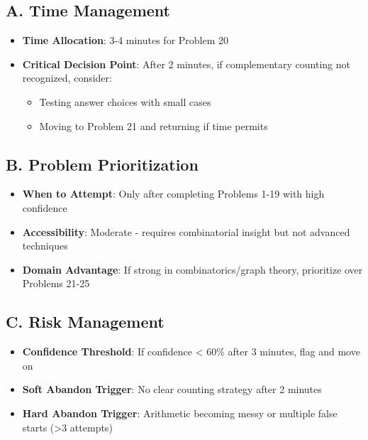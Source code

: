\documentclass[]{article}
\begin{document}
\begin{competitionbox}
\subsection*{A. Time Management}
\begin{itemize}[leftmargin=*]
    \item \textbf{Time Allocation}: 3-4 minutes for Problem 20
    \item \textbf{Critical Decision Point}: After 2 minutes, if complementary counting not recognized, consider:
    \begin{itemize}
        \item Testing answer choices with small cases
        \item Moving to Problem 21 and returning if time permits
    \end{itemize}
\end{itemize}

\subsection*{B. Problem Prioritization}
\begin{itemize}[leftmargin=*]
    \item \textbf{When to Attempt}: Only after completing Problems 1-19 with high confidence
    \item \textbf{Accessibility}: Moderate - requires combinatorial insight but not advanced techniques
    \item \textbf{Domain Advantage}: If strong in combinatorics/graph theory, prioritize over Problems 21-25
\end{itemize}

\subsection*{C. Risk Management}
\begin{itemize}[leftmargin=*]
    \item \textbf{Confidence Threshold}: If confidence < 60\% after 3 minutes, flag and move on
    \item \textbf{Soft Abandon Trigger}: No clear counting strategy after 2 minutes
    \item \textbf{Hard Abandon Trigger}: Arithmetic becoming messy or multiple false starts (>3 attempts)
\end{itemize}


\end{competitionbox}
\end{document}
